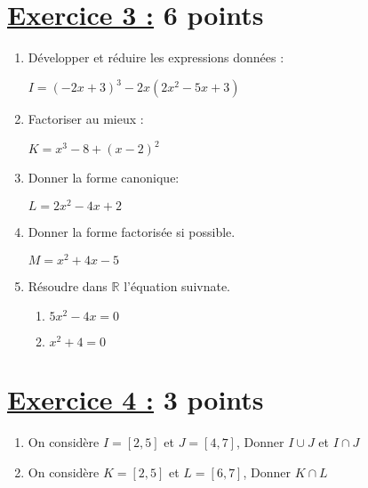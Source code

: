 \documentclass[12pt,a4paper]{article}
\begin{document}
\section*{\underline{Exercice 3 :} 6 points}
\begin{enumerate}
\item Développer et réduire les expressions données :

 \( I = (-2x + 3)^3 - 2x(2x^2 - 5x + 3) \)

\item Factoriser au mieux :

\( K = x^3 - 8 + (x - 2)^2 \)

\item Donner la forme canonique:

$L=2x^{2}-4x+2$

\item Donner la forme factorisée si possible.

$M=x^{2}+4x-5$

\item Résoudre dans $\mathbb{R}$ l'équation suivnate.
\begin{enumerate}
\item $5x^{2}-4x = 0$
\item $x^{2}+4 = 0$
\end{enumerate}
\end{enumerate}

\section*{\underline{Exercice 4 :} 3 points}
\begin{enumerate}
\item On considère $I = [2, 5]$ et $J = [4, 7]$, Donner $I \cup J$ et $I \cap J$

\item On considère $K = [2, 5]$ et $L = [6, 7]$, Donner $K \cap L$
\end{enumerate}
\end{document}
